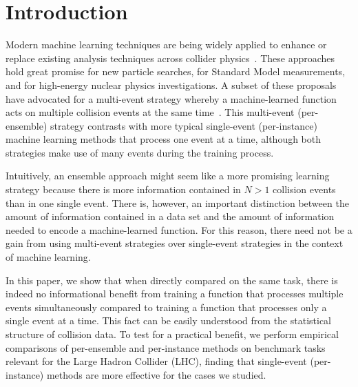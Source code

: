 \documentclass[aps,prx,reprint,preprintnumbers,superscriptaddress,nofootinbib,longbibliography,floatfix]{revtex4-2}
\begin{document}
{\small
\tableofcontents
}

\section{Introduction}

Modern machine learning techniques are being widely applied to enhance or replace existing analysis techniques across collider physics~\cite{Larkoski:2017jix,Guest:2018yhq,Albertsson:2018maf,Radovic:2018dip,Bourilkov:2019yoi,hepmllivingreview}.
%
These approaches hold great promise for new particle searches, for Standard Model measurements, and for high-energy nuclear physics investigations.
%
A subset of these proposals have advocated for a multi-event strategy whereby a machine-learned function acts on multiple collision events at the same time~\cite{Lai:2018ixk,Khosa:2019kxd,Du:2019civ,Mullin:2019mmh,Chang:2020rtc,Flesher:2020kuy,Lazzarin:2020uvv,Lai:2020byl}.
%
This multi-event (per-ensemble) strategy contrasts with more typical single-event (per-instance) machine learning methods that process one event at a time, although both strategies make use of many events during the training process.


Intuitively, an ensemble approach might seem like a more promising learning strategy because there is more information contained in $N>1$ collision events than in one single event.
%
There is, however, an important distinction between the amount of information contained in a data set and the amount of information needed to encode a machine-learned function.
%
For this reason, there need not be a gain from using multi-event strategies over single-event strategies in the context of machine learning.


In this paper, we show that when directly compared on the same task, there is indeed no informational benefit from training a function that processes multiple events simultaneously compared to training a function that processes only a single event at a time.
%
This fact can be easily understood from the statistical structure of collision data.
%
To test for a practical benefit, we perform empirical comparisons of per-ensemble and per-instance methods on benchmark tasks relevant for the Large Hadron Collider (LHC), finding that single-event (per-instance) methods are more effective for the cases we studied.
\end{document}
